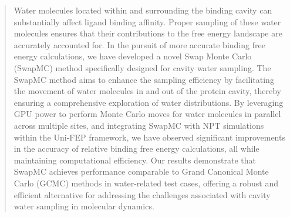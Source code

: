 \documentclass[journal=jacsat,manuscript=article]{achemso}
\begin{document}
\begin{abstract}
Water molecules located within and surrounding the binding cavity can substantially affect ligand binding affinity.
Proper sampling of these water molecules ensures that their contributions to the free energy landscape are accurately accounted for. 
In the pursuit of more accurate binding free energy calculations, we have developed a novel Swap Monte Carlo (SwapMC) method specifically designed for cavity water sampling. 
The SwapMC method aims to enhance the sampling efficiency by facilitating the movement of water molecules in and out of the protein cavity, 
thereby ensuring a comprehensive exploration of water distributions. 
By leveraging GPU power to perform Monte Carlo moves for water molecules in parallel across multiple sites, 
and integrating SwapMC with NPT simulations within the Uni-FEP framework, 
we have observed significant improvements in the accuracy of relative binding free energy calculations, all while maintaining computational efficiency. 
Our results demonstrate that SwapMC achieves performance comparable to Grand Canonical Monte Carlo (GCMC) methods in water-related test cases, 
offering a robust and efficient alternative for addressing the challenges associated with cavity water sampling in molecular dynamics. 
\end{abstract}

\end{document}
